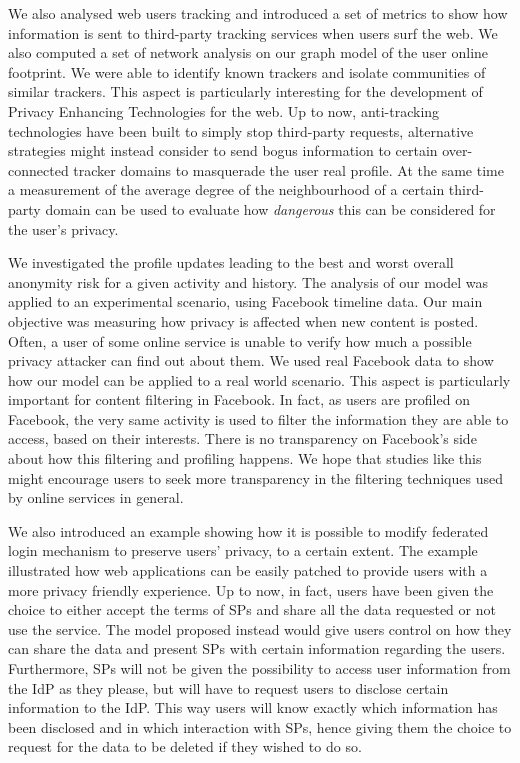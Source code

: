 We also analysed web users tracking and introduced a set of metrics to show how information is sent to third-party tracking services when users surf the web. We also computed a set of network analysis on our graph model of the user online footprint. We were able to identify known trackers and isolate communities of similar trackers. This aspect is particularly interesting for the development of Privacy Enhancing Technologies for the web. Up to now, anti-tracking technologies have been built to simply stop third-party requests, alternative strategies might instead consider to send bogus information to certain over-connected tracker domains to masquerade the user real profile. At the same time a measurement of the average degree of the neighbourhood of a certain third-party domain can be used to evaluate how \emph{dangerous} this can be considered for the user's privacy.

We investigated the profile updates leading to the best and worst overall anonymity risk for a given activity and history. The analysis of our model was applied to an experimental scenario, using Facebook timeline data. Our main objective was measuring how privacy is affected when new content is posted. Often, a user of some online service is unable to verify how much a possible privacy attacker can find out about them. We used real Facebook data to show how our model can be applied to a real world scenario. This aspect is particularly important for content filtering in Facebook. In fact, as users are profiled on Facebook, the very same activity is used to filter the information they are able to access, based on their interests. There is no transparency on Facebook's side about how this filtering and profiling happens. We hope that studies like this might encourage users to seek more transparency in the filtering techniques used by online services in general.

We also introduced an example showing how it is possible to modify federated login mechanism to preserve users' privacy, to a certain extent. The example illustrated how web applications can be easily patched to provide users with a more privacy friendly experience. Up to now, in fact, users have been given the choice to either accept the terms of SPs and share all the data requested or not use the service. The model proposed instead would give users control on how they can share the data and present SPs with certain information regarding the users. 
Furthermore, SPs will not be given the possibility to access user information from the IdP as they please, but will have to request users to disclose certain information to the IdP. This way users will know exactly which information has been disclosed and in which interaction with SPs, hence giving them the choice to request for the data to be deleted if they wished to do so.

